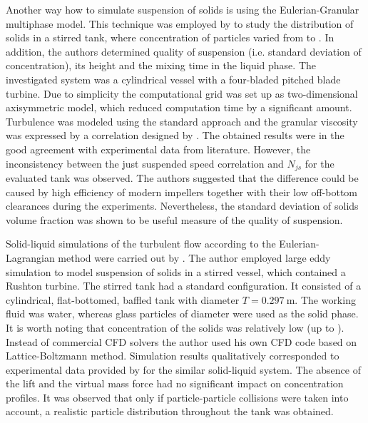 Another way how to simulate suspension of solids is using the Eulerian-Granular multiphase model. This technique was employed by \citet{oshi02} to study the distribution of solids in a stirred tank, where concentration of particles varied from  to . In addition, the authors determined quality of suspension (i.e. standard deviation of concentration), its height and the mixing time in the liquid phase. The investigated system was a cylindrical vessel with a four-bladed pitched blade turbine. Due to simplicity the computational grid was set up as two-dimensional axisymmetric model, which reduced computation time by a significant amount. Turbulence was modeled using the standard \keps{} approach and the granular viscosity was expressed by a correlation designed by \citet{syam93}. The obtained results were in the good agreement with experimental data from literature. However, the inconsistency between the just suspended speed correlation and $N_{js}$ for the evaluated tank was observed. The authors suggested that the difference could be caused by high efficiency of modern impellers together with their low off-bottom clearances during the experiments. Nevertheless, the standard deviation of solids volume fraction was shown to be useful measure of the quality of suspension. 

Solid-liquid simulations of the turbulent flow according to the Eulerian-Lagrangian method were carried out by \citet{derk03}. The author employed large eddy simulation to model suspension of solids in a stirred vessel, which contained a Rushton turbine. The stirred tank had a standard configuration. It consisted of a cylindrical, flat-bottomed, baffled tank with diameter $T=\SI{0.297}{\meter}$. The working fluid was water, whereas glass particles of diameter were used as the solid phase. It is worth noting that concentration of the solids was relatively low (up to ). Instead of commercial CFD solvers the author used his own CFD code based on Lattice-Boltzmann method. Simulation results qualitatively corresponded to experimental data provided by \citet{miche03} for the similar solid-liquid system. The absence of the lift and the virtual mass force had no significant impact on concentration profiles. It was observed that only if particle-particle collisions were taken into account, a realistic particle distribution throughout the tank was obtained.

